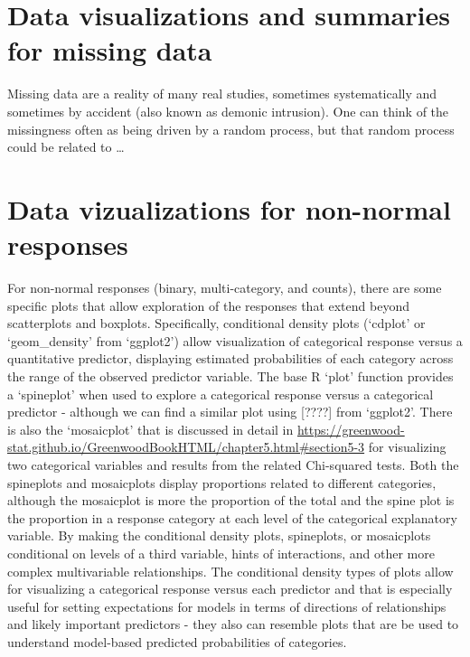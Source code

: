 \documentclass[
]{book}
\begin{document}
\hypertarget{section5-3}{%
\section{Data visualizations and summaries for missing data}\label{section5-3}}

Missing data are a reality of many real studies, sometimes systematically and sometimes by accident (also known as demonic intrusion). One can think of the missingness often as being driven by a random process, but that random process could be related to \ldots{}

\hypertarget{section5-4}{%
\section{Data vizualizations for non-normal responses}\label{section5-4}}

For non-normal responses (binary, multi-category, and counts), there are some specific plots that allow exploration of the responses that extend beyond scatterplots and boxplots. Specifically, conditional density plots (`cdplot' or `geom\_density' from `ggplot2') allow visualization of categorical response versus a quantitative predictor, displaying estimated probabilities of each category across the range of the observed predictor variable. The base R `plot' function provides a `spineplot' when used to explore a categorical response versus a categorical predictor - although we can find a similar plot using {[}????{]} from `ggplot2'. There is also the `mosaicplot' that is discussed in detail in \url{https://greenwood-stat.github.io/GreenwoodBookHTML/chapter5.html\#section5-3} for visualizing two categorical variables and results from the related Chi-squared tests. Both the spineplots and mosaicplots display proportions related to different categories, although the mosaicplot is more the proportion of the total and the spine plot is the proportion in a response category at each level of the categorical explanatory variable. By making the conditional density plots, spineplots, or mosaicplots conditional on levels of a third variable, hints of interactions, and other more complex multivariable relationships. The conditional density types of plots allow for visualizing a categorical response versus each predictor and that is especially useful for setting expectations for models in terms of directions of relationships and likely important predictors - they also can resemble plots that are be used to understand model-based predicted probabilities of categories.
\end{document}
